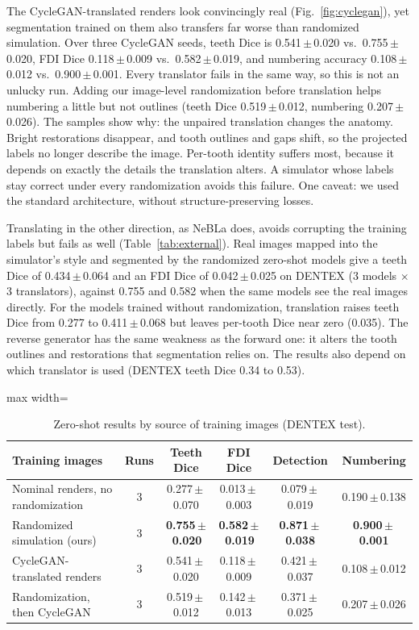 \documentclass[preprint,12pt]{elsarticle}
\newcommand{\pmsd}[2]{#1\,$\pm$\,#2}
\begin{document}
The CycleGAN-translated renders look convincingly real (Fig.~\ref{fig:cyclegan}), yet segmentation trained on them also
transfers far worse than randomized simulation. Over three CycleGAN seeds, teeth Dice is \pmsd{0.541}{0.020} vs.\
\pmsd{0.755}{0.020}, FDI Dice \pmsd{0.118}{0.009} vs.\ \pmsd{0.582}{0.019}, and numbering accuracy \pmsd{0.108}{0.012}
vs.\ \pmsd{0.900}{0.001}. Every translator fails in the same way, so this is not an unlucky run. Adding our image-level
randomization before translation helps numbering a little but not outlines (teeth Dice \pmsd{0.519}{0.012}, numbering
\pmsd{0.207}{0.026}). The samples show why: the
unpaired translation changes the anatomy. Bright restorations disappear, and tooth outlines and gaps shift, so the
projected labels no longer describe the image. Per-tooth identity suffers most, because it depends on exactly the details
the translation alters. A simulator whose labels stay correct under every randomization avoids this failure. One caveat:
we used the standard architecture, without structure-preserving losses.

Translating in the other direction, as NeBLa does, avoids corrupting the training labels but fails as well
(Table~\ref{tab:external}). Real images mapped into the simulator's style and segmented by the randomized zero-shot
models give a teeth Dice of \pmsd{0.434}{0.064} and an FDI Dice of \pmsd{0.042}{0.025} on DENTEX (3 models $\times$ 3
translators), against 0.755 and 0.582 when the same models see the real images directly. For the models trained without
randomization, translation raises teeth Dice from 0.277 to \pmsd{0.411}{0.068} but leaves per-tooth Dice
near zero (0.035). The reverse generator has the same weakness as the forward one: it alters the tooth outlines and
restorations that segmentation relies on. The results also depend on which translator is used (DENTEX teeth Dice 0.34
to 0.53).

\begin{table}[t]
\centering\small
\caption{Zero-shot results by source of training images (DENTEX test).}
\label{tab:sources}
\begin{adjustbox}{max width=\linewidth}
\begin{tabular}{@{}lccccc@{}}
\toprule
Training images & Runs & Teeth Dice & FDI Dice & Detection & Numbering \\
\midrule
Nominal renders, no randomization & 3 & \pmsd{0.277}{0.070} & \pmsd{0.013}{0.003} & \pmsd{0.079}{0.019} & \pmsd{0.190}{0.138} \\
Randomized simulation (ours) & 3 & \textbf{\pmsd{0.755}{0.020}} & \textbf{\pmsd{0.582}{0.019}} & \textbf{\pmsd{0.871}{0.038}} & \textbf{\pmsd{0.900}{0.001}} \\
CycleGAN-translated renders & 3 & \pmsd{0.541}{0.020} & \pmsd{0.118}{0.009} & \pmsd{0.421}{0.037} & \pmsd{0.108}{0.012} \\
Randomization, then CycleGAN & 3 & \pmsd{0.519}{0.012} & \pmsd{0.142}{0.013} & \pmsd{0.371}{0.025} & \pmsd{0.207}{0.026} \\
\bottomrule
\end{tabular}
\end{adjustbox}
\end{table}
\end{document}
